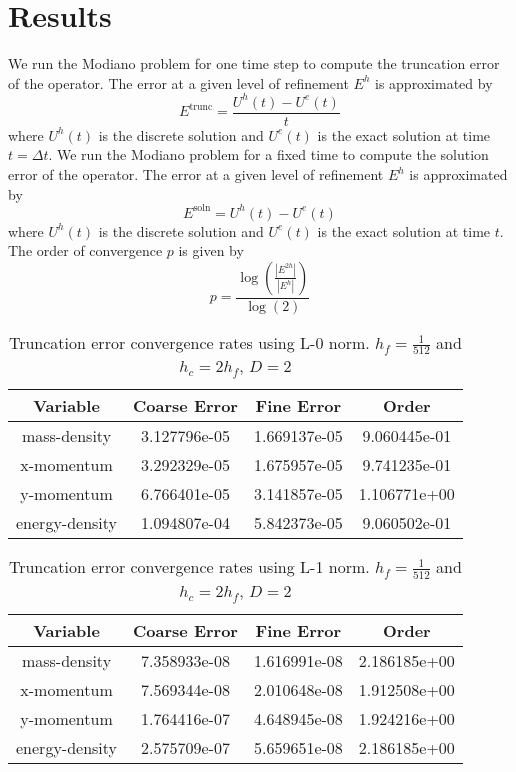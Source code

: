 \section{Results}

We run the Modiano problem for one time step to compute the truncation
error of the operator.   The error at a given level of refinement
$E^h$ is approximated by
\begin{equation}
E^\text{trunc} = \frac{U^h(t) -U^e(t)}{t}
\end{equation}
where $U^h(t)$ is the discrete solution  and  $U^e (t)$ is the exact
solution at time $t = \Delta t$.     We run the Modiano problem for a
fixed time to compute the solution error of the operator.   The error
at a given level of refinement $E^h$ is approximated by
\begin{equation}
E^\text{soln} = {U^h(t) -U^e(t)}
\end{equation}
where $U^h(t)$ is the discrete solution  and  $U^e (t)$ is the exact
solution at time $t$.     The order of convergence $p$ is given by 
\begin{equation}
p = \frac{\log(\frac{|E^{2h}|}{|E^{h}|})}{\log(2)}
\end{equation}


\begin{table}[p]
\begin{center}
\begin{tabular}{|c|c|c|c|} \hline
Variable & Coarse Error & Fine Error & Order\\
\hline \hline 
mass-density &    	 3.127796e-05 & 1.669137e-05 & 9.060445e-01 \\ 
\hline
x-momentum &    	 3.292329e-05 & 1.675957e-05 & 9.741235e-01 \\ 
\hline
y-momentum &    	 6.766401e-05 & 3.141857e-05 & 1.106771e+00 \\ 
\hline
energy-density &    	 1.094807e-04 & 5.842373e-05 & 9.060502e-01 \\ 
\hline
\end{tabular}
\end{center}
\caption{Truncation error convergence rates using L-0 norm. 
$h_f = \frac{1}{512}$ and $h_c = 2 h_f$, $D = 2$ }
\end{table}


\begin{table}[p]
\begin{center}
\begin{tabular}{|c|c|c|c|} \hline
Variable & Coarse Error & Fine Error & Order\\
\hline \hline 
mass-density &    	 7.358933e-08 & 1.616991e-08 & 2.186185e+00 \\ 
\hline
x-momentum &    	 7.569344e-08 & 2.010648e-08 & 1.912508e+00 \\ 
\hline
y-momentum &    	 1.764416e-07 & 4.648945e-08 & 1.924216e+00 \\ 
\hline
energy-density &    	 2.575709e-07 & 5.659651e-08 & 2.186185e+00 \\ 
\hline
\end{tabular}
\end{center}
\caption{Truncation error convergence rates using L-1 norm. 
$h_f = \frac{1}{512}$ and $h_c = 2 h_f$, $D = 2$ }
\end{table}


